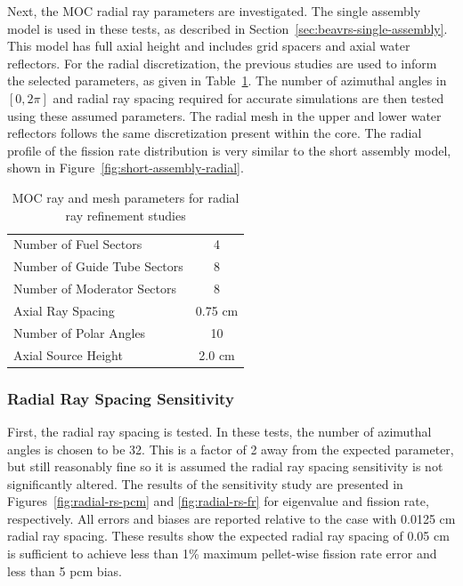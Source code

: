 Next, the \ac{MOC} radial ray parameters are investigated. The single assembly model is used in these tests, as described in Section~\ref{sec:beavrs-single-assembly}. This model has full axial height and includes grid spacers and axial water reflectors. For the radial discretization, the previous studies are used to inform the selected parameters, as given in Table~\ref{tab:rad-ray-ref-params}. The number of azimuthal angles in $[0, 2\pi]$ and radial ray spacing required for accurate simulations are then tested using these assumed parameters. The radial mesh in the upper and lower water reflectors follows the same discretization present within the core. The radial profile of the fission rate distribution is very similar to the short assembly model, shown in Figure~\ref{fig:short-assembly-radial}.

\begin{table}[ht]
	\centering
	\caption{MOC ray and mesh parameters for radial ray refinement studies}
	\medskip
	\begin{tabular}{lc}
		\hline
		Number of Fuel Sectors & 4 \\
		Number of Guide Tube Sectors & 8 \\
		Number of Moderator Sectors & 8 \\
		Axial Ray Spacing & 0.75 cm \\
		Number of Polar Angles & 10 \\
		Axial Source Height & 2.0 cm \\
		\hline
	\end{tabular}
	\label{tab:rad-ray-ref-params}
\end{table}

\subsubsection{Radial Ray Spacing Sensitivity}

First, the radial ray spacing is tested. In these tests, the number of azimuthal angles is chosen to be 32. This is a factor of 2 away from the expected parameter, but still reasonably fine so it is assumed the radial ray spacing sensitivity is not significantly altered. The results of the sensitivity study are presented in Figures~\ref{fig:radial-rs-pcm} and \ref{fig:radial-rs-fr} for eigenvalue and fission rate, respectively. All errors and biases are reported relative to the case with 0.0125 cm radial ray spacing. These results show the expected radial ray spacing of 0.05 cm is sufficient to achieve less than 1\% maximum pellet-wise fission rate error and less than 5 pcm bias.

